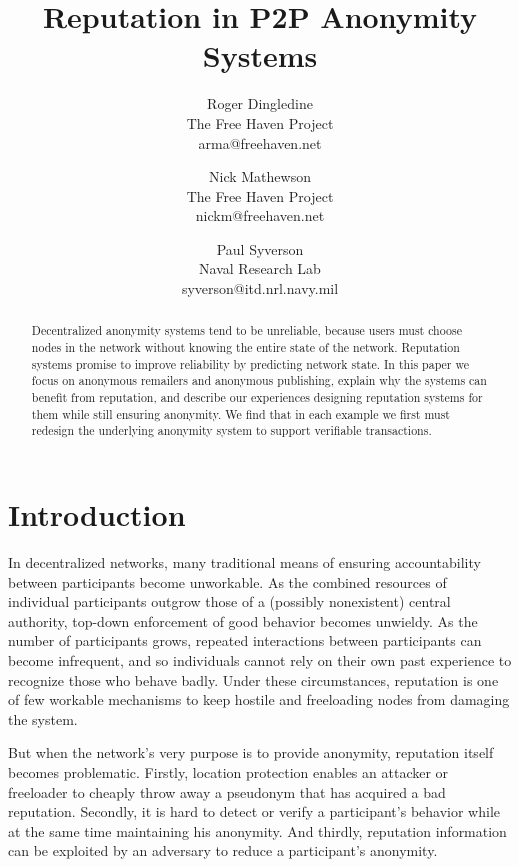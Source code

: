 \documentclass[times,10pt,twocolumn]{article}
\begin{document}
\title{Reputation in P2P Anonymity Systems}

\author{Roger Dingledine \\ The Free Haven Project \\ arma@freehaven.net \and
Nick Mathewson \\ The Free Haven Project \\ nickm@freehaven.net \and
Paul Syverson \\ Naval Research Lab \\ syverson@itd.nrl.navy.mil}

\maketitle

\begin{abstract}

Decentralized anonymity systems tend to be unreliable, because users
must choose nodes in the network without knowing the entire state
of the network. Reputation systems promise to improve reliability by
predicting network state. In this paper we focus on anonymous remailers
and anonymous publishing, explain why the systems can benefit from
reputation, and describe our experiences designing reputation systems
for them while still ensuring anonymity. We find that in each example we
first must redesign the underlying anonymity system to support verifiable
transactions.

\end{abstract}

\section{Introduction}

In decentralized networks, many traditional means of ensuring
accountability between participants become unworkable.  As the
combined resources of individual participants outgrow those of a
(possibly nonexistent) central authority, top-down enforcement of good
behavior becomes unwieldy.  As the number of participants grows,
repeated interactions between participants can become
infrequent, and so individuals cannot rely on their own past
experience to recognize those who behave badly.  Under these
circumstances, reputation is one of few workable mechanisms to keep hostile
and freeloading nodes from damaging the system.

But when the network's very purpose is to provide anonymity, reputation
itself becomes problematic. Firstly, location protection enables an
attacker or freeloader to cheaply throw away a pseudonym that has acquired
a bad reputation. Secondly, it is hard to detect or verify a participant's
behavior while at the same time maintaining
his anonymity. And thirdly, reputation information can be exploited by
an adversary to reduce a participant's anonymity.
\end{document}
